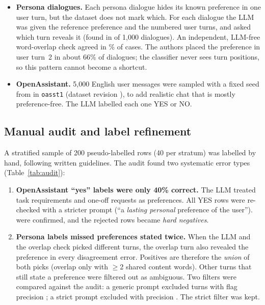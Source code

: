 \documentclass[11pt,a4paper]{article}
\begin{document}
\begin{itemize}
  \item \textbf{Persona dialogues.} Each persona dialogue hides its known preference in one user turn, but the dataset does not mark which.
        For each dialogue the LLM was given the reference preference and the numbered user turns, and asked which turn reveals it
        (found in \pPersonaFound{} of 1{,}000 dialogues). An independent, LLM-free word-overlap check agreed in \pOverlapAgree\% of cases.
        The authors placed the preference in user turn~2 in about 66\% of dialogues; the classifier never sees turn positions, so this
        pattern cannot become a shortcut.
  \item \textbf{OpenAssistant.} 5{,}000 English user messages were sampled with a fixed seed from \pOasstPool{} in \texttt{oasst1}
        (dataset revision \texttt{\pOasstRev}), to add realistic chat that is mostly preference-free. The LLM labelled each one YES or NO.
\end{itemize}

\begin{table}[H]
\centering\small

\caption{Final training data after refinement and audit overrides. Persona-turn and OpenAssistant labels are refined LLM pseudo-labels;
182 rows carry the human audit label.}
\label{tab:data}
\end{table}

\subsection{Manual audit and label refinement}
A stratified sample of 200 pseudo-labelled rows (40 per stratum) was labelled by hand, following written guidelines. The
audit found two systematic error types (Table~\ref{tab:audit}):
\begin{enumerate}
  \item \textbf{OpenAssistant ``yes'' labels were only 40\% correct.} The LLM treated task requirements and one-off requests as
        preferences. All \pOasstYes{} YES rows were re-checked with a stricter prompt (``a \emph{lasting personal} preference of the
        user''). \pStrictConfirmed{} were confirmed, and the \pStrictRejected{} rejected rows became \emph{hard negatives}.
  \item \textbf{Persona labels missed preferences stated twice.} When the LLM and the overlap check picked different turns, the
        overlap turn also revealed the preference in every disagreement error. Positives are therefore the \emph{union} of both picks
        (overlap only with $\ge$2 shared content words). Other turns that still state a preference were filtered out as ambiguous. Two filters
        were compared against the audit: a generic prompt excluded \pGenericExcl{} turns with flag precision \pGenericPrec; a strict prompt
        excluded \pStrictExcl{} with precision \pStrictPrec{}. The strict filter was kept.
\end{enumerate}
\end{document}
